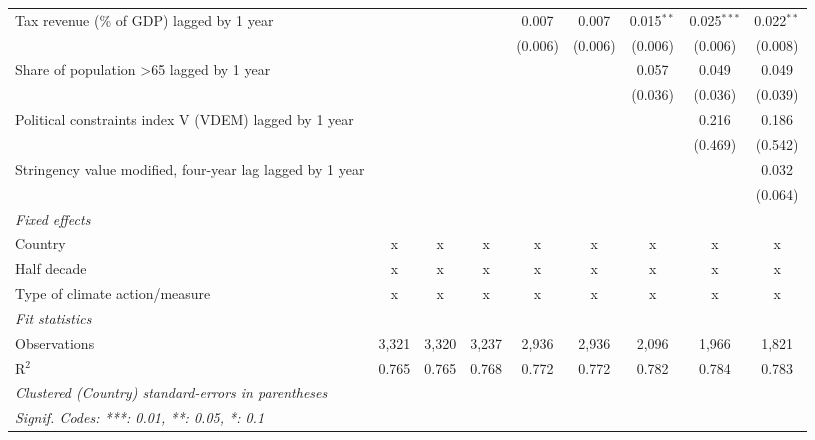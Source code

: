 \begin{tabular}{lcccccccc}
   Tax revenue (\% of GDP) lagged by 1 year                  &         &         &         & 0.007   & 0.007   & 0.015$^{**}$ & 0.025$^{***}$ & 0.022$^{**}$\\   
                                                             &         &         &         & (0.006) & (0.006) & (0.006)      & (0.006)       & (0.008)\\   
   Share of population >65 lagged by 1 year                  &         &         &         &         &         & 0.057        & 0.049         & 0.049\\   
                                                             &         &         &         &         &         & (0.036)      & (0.036)       & (0.039)\\   
   Political constraints index V (VDEM) lagged by 1 year     &         &         &         &         &         &              & 0.216         & 0.186\\   
                                                             &         &         &         &         &         &              & (0.469)       & (0.542)\\   
   Stringency value modified, four-year lag lagged by 1 year &         &         &         &         &         &              &               & 0.032\\   
                                                             &         &         &         &         &         &              &               & (0.064)\\   
   \emph{Fixed effects}\\
   Country                                                   & x       & x       & x       & x       & x       & x            & x             & x\\  
   Half decade                                               & x       & x       & x       & x       & x       & x            & x             & x\\  
   Type of climate action/measure                            & x       & x       & x       & x       & x       & x            & x             & x\\  
   \midrule \emph{Fit statistics}\\
   Observations                                              & 3,321   & 3,320   & 3,237   & 2,936   & 2,936   & 2,096        & 1,966         & 1,821\\  
   R$^2$                                                     & 0.765   & 0.765   & 0.768   & 0.772   & 0.772   & 0.782        & 0.784         & 0.783\\  
   \midrule
   \multicolumn{9}{l}{\emph{Clustered (Country) standard-errors in parentheses}}\\
   \multicolumn{9}{l}{\emph{Signif. Codes: ***: 0.01, **: 0.05, *: 0.1}}\\
\end{tabular}
\par\endgroup


